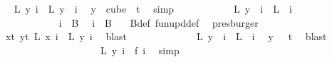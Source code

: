 \begin{isabellebody}
\ \isamarkupfalse%
\ {\isachardoublequoteopen}{\isacharquery}{\kern0pt}L\ y\ i\ {\isacharequal}{\kern0pt}\ L\ {\isacharparenleft}{\kern0pt}y\ {}{\isacharparenright}{\kern0pt}\ i{\isachardoublequoteclose}\ \isamarkupfalse%
\ {\isacartoucheopen}y\ {\isasymin}\ cube\ {}\ t{\isacartoucheclose}\ \isamarkupfalse%
\ simp\isanewline
\ \ \ \ \ \ \ \ \isamarkupfalse%
\ \isamarkupfalse%
\ {\isachardoublequoteopen}L\ {\isacharparenleft}{\kern0pt}y\ {}{\isacharparenright}{\kern0pt}\ i\ {\isacharequal}{\kern0pt}\ L\ {}\ i{\isachardoublequoteclose}\ \isanewline
\ \ \ \ \ \ \ \ \isamarkupfalse%
\ {\isacharminus}{\kern0pt}\isanewline
\ \ \ \ \ \ \ \ \ \ \isamarkupfalse%
\ {\isachardoublequoteopen}i\ {\isasymin}\ {\isacharquery}{\kern0pt}B{}{\isachardoublequoteclose}\ \isamarkupfalse%
\ {\isacartoucheopen}i\ {\isasymin}\ B\ {}{\isacartoucheclose}\ \isamarkupfalse%
\ B{\isacharunderscore}{\kern0pt}def\ fun{\isacharunderscore}{\kern0pt}upd{\isacharunderscore}{\kern0pt}def\ \isamarkupfalse%
\ presburger\isanewline
\ \ \ \ \ \ \ \ \ \ \isamarkupfalse%
\ \isamarkupfalse%
\ {\isachardoublequoteopen}{\isacharparenleft}{\kern0pt}{\isasymforall}x{\isacharless}{\kern0pt}t{\isachardot}{\kern0pt}\ {\isasymforall}y{\isacharless}{\kern0pt}t{\isachardot}{\kern0pt}\ L\ x\ i\ {\isacharequal}{\kern0pt}\ L\ y\ i{\isacharparenright}{\kern0pt}{\isachardoublequoteclose}\ \isamarkupfalse%
\ blast\isanewline
\ \ \ \ \ \ \ \ \ \ \isamarkupfalse%
\ \isamarkupfalse%
\ {\isachardoublequoteopen}L\ {\isacharparenleft}{\kern0pt}y\ {}{\isacharparenright}{\kern0pt}\ i\ {\isacharequal}{\kern0pt}\ L\ {}\ i{\isachardoublequoteclose}\ \isamarkupfalse%
\ {\isacartoucheopen}y\ {}\ {\isasymin}\ {\isacharbraceleft}{\kern0pt}{\isachardot}{\kern0pt}{\isachardot}{\kern0pt}{\isacharless}{\kern0pt}t{\isacharbraceright}{\kern0pt}{\isacartoucheclose}\ \isamarkupfalse%
\ blast\isanewline
\ \ \ \ \ \ \ \ \isamarkupfalse%
\isanewline
\ \ \ \ \ \ \ \ \isamarkupfalse%
\ \isamarkupfalse%
\ {\isachardoublequoteopen}{\isacharquery}{\kern0pt}L\ y\ i\ {\isacharequal}{\kern0pt}\ {\isacharquery}{\kern0pt}f\ i{\isachardoublequoteclose}\ \isamarkupfalse%
\ simp\isanewline

\end{isabellebody}
